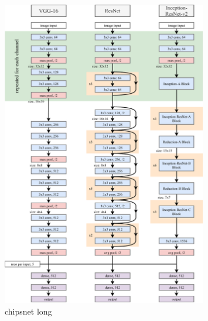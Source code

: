 \begin{figure} %
    \includegraphics[width=0.8\textwidth]{diagrams/6-cvn/chipsnet.pdf}
    \caption[chipsnet short]
    {chipsnet long}
    \label{fig:chipsnet}
\end{figure} %

